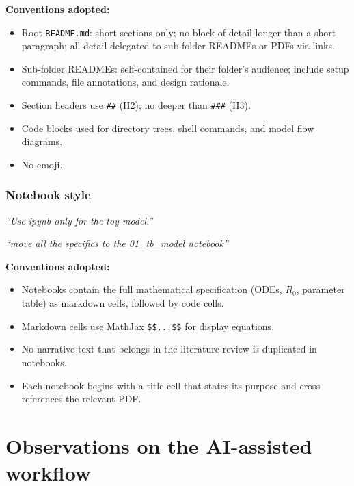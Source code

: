 \documentclass[11pt]{article}
\begin{document}
\noindent \textbf{Conventions adopted:}
\begin{itemize}[noitemsep]
  \item Root \texttt{README.md}: short sections only; no block of detail longer than a short paragraph; all detail delegated to sub-folder READMEs or PDFs via links.
  \item Sub-folder READMEs: self-contained for their folder's audience; include setup commands, file annotations, and design rationale.
  \item Section headers use \texttt{\#\#} (H2); no deeper than \texttt{\#\#\#} (H3).
  \item Code blocks used for directory trees, shell commands, and model flow diagrams.
  \item No emoji.
\end{itemize}

\subsubsection{Notebook style}

\begin{promptbox}
\textit{``Use ipynb only for the toy model.''}
\end{promptbox}

\begin{promptbox}
\textit{``move all the specifics to the 01\_tb\_model notebook''}
\end{promptbox}

\noindent \textbf{Conventions adopted:}
\begin{itemize}[noitemsep]
  \item Notebooks contain the full mathematical specification (ODEs, $R_0$, parameter table) as markdown cells, followed by code cells.
  \item Markdown cells use MathJax \texttt{\$\$...\$\$} for display equations.
  \item No narrative text that belongs in the literature review is duplicated in notebooks.
  \item Each notebook begins with a title cell that states its purpose and cross-references the relevant PDF.
\end{itemize}

\section{Observations on the AI-assisted workflow}
\end{document}
